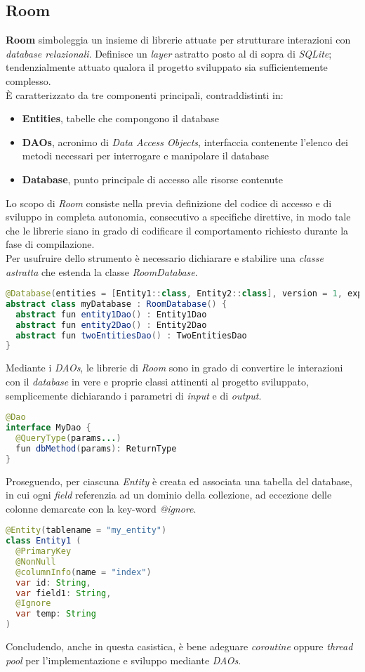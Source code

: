 \documentclass{article}
\begin{document}
\subsection*{Room}
\textbf{Room} simboleggia un insieme di librerie attuate per strutturare interazioni con \textit{database relazionali}. Definisce un \textit{layer} astratto posto al di sopra di \textit{SQLite}; tendenzialmente attuato qualora il progetto sviluppato sia sufficientemente complesso.\vspace*{7pt}\\
È caratterizzato da tre componenti principali, contraddistinti in:
\begin{itemize}[label={-}]
  \itemsep0em
  \item \textbf{Entities}, tabelle che compongono il database
  \item \textbf{DAOs}, acronimo di \textit{Data Access Objects}, interfaccia contenente l'elenco dei metodi necessari per interrogare e manipolare il database
  \item \textbf{Database}, punto principale di accesso alle risorse contenute
\end{itemize}
Lo scopo di \textit{Room} consiste nella previa definizione del codice di accesso e di sviluppo in completa autonomia, consecutivo a specifiche direttive, in modo tale che le librerie siano in grado di codificare il comportamento richiesto durante la fase di compilazione.\vspace*{7pt}\\
Per usufruire dello strumento è necessario dichiarare e stabilire una \textit{classe astratta} che estenda la classe \textit{RoomDatabase}.
\begin{lstlisting}[language=JAVA]
@Database(entities = [Entity1::class, Entity2::class], version = 1, exportSchema = false)
abstract class myDatabase : RoomDatabase() {
  abstract fun entity1Dao() : Entity1Dao
  abstract fun entity2Dao() : Entity2Dao
  abstract fun twoEntitiesDao() : TwoEntitiesDao
}
\end{lstlisting}
Mediante i \textit{DAOs}, le librerie di \textit{Room} sono in grado di convertire le interazioni con il \textit{database} in vere e proprie classi attinenti al progetto sviluppato, semplicemente dichiarando i parametri di \textit{input} e di \textit{output}.
\begin{lstlisting}[language=JAVA]
@Dao
interface MyDao {
  @QueryType(params...)
  fun dbMethod(params): ReturnType
}
\end{lstlisting}  
Proseguendo, per ciascuna \textit{Entity} è creata ed associata una tabella del database, in cui ogni \textit{field} referenzia ad un dominio della collezione, ad eccezione delle colonne demarcate con la key-word \textit{@ignore}. 
\begin{lstlisting}[language=JAVA]
@Entity(tablename = "my_entity") 
class Entity1 (
  @PrimaryKey
  @NonNull
  @columnInfo(name = "index")
  var id: String,
  var field1: String,
  @Ignore
  var temp: String
)
\end{lstlisting}
Concludendo, anche in questa casistica, è bene adeguare \textit{coroutine} oppure \textit{thread pool} per l'implementazione e sviluppo mediante \textit{DAOs}.
\end{document}
